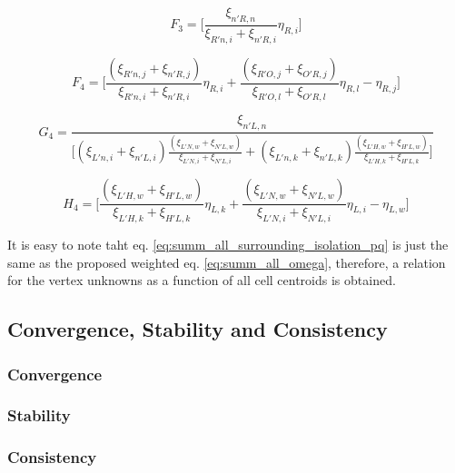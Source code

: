 \documentclass{article}
\begin{document}
\begin{displaymath}
F_{3} = \Bigg[\frac{\xi_{n'R,n}}{\xi_{R'n,i}+\xi_{n'R,i}}\eta_{R,i}\Bigg]
\end{displaymath}

\begin{displaymath}
F_{4} = \Bigg[\frac{(\xi_{R'n,j}+\xi_{n'R,j})}{\xi_{R'n,i}+\xi_{n'R,i}}\eta_{R,i}
+\frac{(\xi_{R'O,j}+\xi_{O'R,j})}{\xi_{R'O,l}+\xi_{O'R,l}} \eta_{R,l}-\eta_{R,j}\Bigg]
\end{displaymath}

\begin{displaymath}
G_{4} = \frac{\xi_{n'L,n}}{\Bigg[ (\xi_{L'n,i}+\xi_{n'L,i})\frac{(\xi_{L'N,w}+\xi_{N'L,w})}{\xi_{L'N,i}+\xi_{N'L,i}} + (\xi_{L'n,k}+\xi_{n'L,k})	\frac{(\xi_{L'H,w}+\xi_{H'L,w})}{\xi_{L'H,k}+\xi_{H'L,k}} \Bigg]}
\end{displaymath}

\begin{displaymath}
H_{4} = \Bigg[\frac{ (\xi_{L'H,w}+\xi_{H'L,w})}{\xi_{L'H,k}+\xi_{H'L,k}}\eta_{L,k}
 +\frac{(\xi_{L'N,w}+\xi_{N'L,w})}{\xi_{L'N,i}+\xi_{N'L,i}}\eta_{L,i} - \eta_{L,w}\Bigg]
\end{displaymath}

It is easy to note taht eq. \ref{eq:summ_all_surrounding_isolation_pq} is just the same as the proposed weighted eq. \ref{eq:summ_all_omega}, therefore, a relation for the vertex unknowns as a function of all cell centroids is obtained.	
	\subsection{Convergence, Stability and Consistency}
		\subsubsection{Convergence}
		
		\subsubsection{Stability}
		
		\subsubsection{Consistency}
\end{document}
